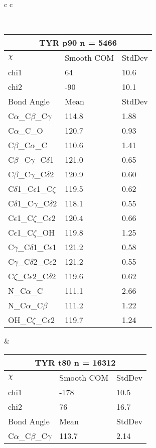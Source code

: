 \begin{longtable}{ c c }

\caption{TYR Central Values}\\
  \begin{tabular}{ l l l }
  \toprule
  \multicolumn{3}{c}{TYR \textbf{p90} n = 5466} \\ \toprule
  $\chi$       & Smooth COM & StdDev \\ \midrule
  chi1 & 64 & 10.6 \\ 
  chi2 & -90 & 10.1 \\ \midrule
  Bond Angle   & Mean     & StdDev \\ \midrule
  C$\alpha$\_C$\beta$\_C$\gamma$ & 114.8 & 1.88\\
  C$\alpha$\_C\_O & 120.7 & 0.93\\
  C$\beta$\_C$\alpha$\_C & 110.6 & 1.41\\
  C$\beta$\_C$\gamma$\_C$\delta$1 & 121.0 & 0.65\\
  C$\beta$\_C$\gamma$\_C$\delta$2 & 120.9 & 0.60\\
  C$\delta$1\_C$\epsilon$1\_C$\zeta$ & 119.5 & 0.62\\
  C$\delta$1\_C$\gamma$\_C$\delta$2 & 118.1 & 0.55\\
  C$\epsilon$1\_C$\zeta$\_C$\epsilon$2 & 120.4 & 0.66\\
  C$\epsilon$1\_C$\zeta$\_OH & 119.8 & 1.25\\
  C$\gamma$\_C$\delta$1\_C$\epsilon$1 & 121.2 & 0.58\\
  C$\gamma$\_C$\delta$2\_C$\epsilon$2 & 121.2 & 0.55\\
  C$\zeta$\_C$\epsilon$2\_C$\delta$2 & 119.6 & 0.62\\
  N\_C$\alpha$\_C & 111.1 & 2.66\\
  N\_C$\alpha$\_C$\beta$ & 111.2 & 1.22\\
  OH\_C$\zeta$\_C$\epsilon$2 & 119.7 & 1.24\\
  \bottomrule
  \end{tabular}
  &
  \begin{tabular}{ l l l }
  \toprule
  \multicolumn{3}{c}{TYR \textbf{t80} n = 16312} \\ \toprule
  $\chi$       & Smooth COM & StdDev \\ \midrule
  chi1 & -178 & 10.5 \\ 
  chi2 & 76 & 16.7 \\ \midrule
  Bond Angle   & Mean     & StdDev \\ \midrule
  C$\alpha$\_C$\beta$\_C$\gamma$ & 113.7 & 2.14\\

\end{tabular}
\end{longtable}
